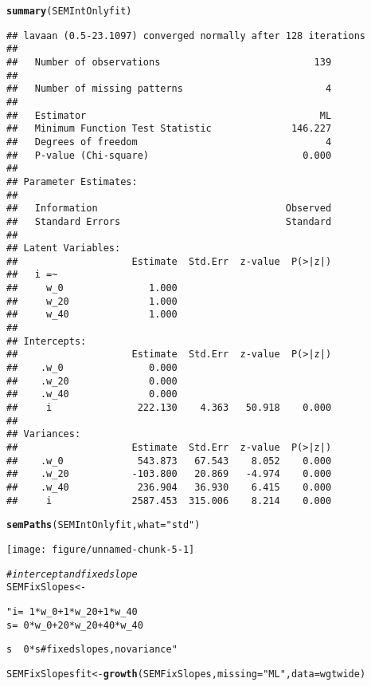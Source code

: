 \documentclass{article}\usepackage[]{graphicx}\usepackage[]{color}
\makeatletter
\def\maxwidth{ %
  \ifdim\Gin@nat@width>\linewidth
    \linewidth
  \else
    \Gin@nat@width
  \fi
}
\newcommand{\hlstr}[1]{\textcolor[rgb]{0.192,0.494,0.8}{#1}}%
\newcommand{\hlcom}[1]{\textcolor[rgb]{0.678,0.584,0.686}{\textit{#1}}}%
\newcommand{\hlstd}[1]{\textcolor[rgb]{0.345,0.345,0.345}{#1}}%
\newcommand{\hlkwb}[1]{\textcolor[rgb]{0.69,0.353,0.396}{#1}}%
\newcommand{\hlkwc}[1]{\textcolor[rgb]{0.333,0.667,0.333}{#1}}%
\newcommand{\hlkwd}[1]{\textcolor[rgb]{0.737,0.353,0.396}{\textbf{#1}}}%
\newenvironment{kframe}{%
 \def\at@end@of@kframe{}%
 \ifinner\ifhmode%
  \def\at@end@of@kframe{\end{minipage}}%
  \begin{minipage}{\columnwidth}%
 \fi\fi%
 \def\FrameCommand##1{\hskip\@totalleftmargin \hskip-\fboxsep
 \colorbox{shadecolor}{##1}\hskip-\fboxsep
     \hskip-\linewidth \hskip-\@totalleftmargin \hskip\columnwidth}%
 \MakeFramed {\advance\hsize-\width
   \@totalleftmargin\z@ \linewidth\hsize
   \@setminipage}}%
 {\par\unskip\endMakeFramed%
 \at@end@of@kframe}
\newenvironment{knitrout}{}{} %
\makeatother
\begin{document}
\begin{knitrout}
\begin{kframe}
{\ttfamily\noindent\color{warningcolor}{\#\# Warning in lav\_object\_post\_check(object): lavaan WARNING: some estimated ov variances are negative}}\begin{alltt}
\hlkwd{summary}\hlstd{(SEMIntOnlyfit)}
\end{alltt}
\begin{verbatim}
## lavaan (0.5-23.1097) converged normally after 128 iterations
## 
##   Number of observations                           139
## 
##   Number of missing patterns                         4
## 
##   Estimator                                         ML
##   Minimum Function Test Statistic              146.227
##   Degrees of freedom                                 4
##   P-value (Chi-square)                           0.000
## 
## Parameter Estimates:
## 
##   Information                                 Observed
##   Standard Errors                             Standard
## 
## Latent Variables:
##                    Estimate  Std.Err  z-value  P(>|z|)
##   i =~                                                
##     w_0               1.000                           
##     w_20              1.000                           
##     w_40              1.000                           
## 
## Intercepts:
##                    Estimate  Std.Err  z-value  P(>|z|)
##    .w_0               0.000                           
##    .w_20              0.000                           
##    .w_40              0.000                           
##     i               222.130    4.363   50.918    0.000
## 
## Variances:
##                    Estimate  Std.Err  z-value  P(>|z|)
##    .w_0             543.873   67.543    8.052    0.000
##    .w_20           -103.800   20.869   -4.974    0.000
##    .w_40            236.904   36.930    6.415    0.000
##     i              2587.453  315.006    8.214    0.000
\end{verbatim}
\begin{alltt}
\hlkwd{semPaths}\hlstd{(SEMIntOnlyfit,} \hlkwc{what} \hlstd{=} \hlstr{"std"}\hlstd{)}
\end{alltt}
\end{kframe}
\texttt{[image: figure/unnamed-chunk-5-1]} 
\begin{kframe}\begin{alltt}
\hlcom{# intercept and fixed slope}
\hlstd{SEMFixSlopes} \hlkwb{<-} \hlstr{" i =~ 1*w_0 + 1*w_20 + 1*w_40
                  s =~ 0*w_0 + 20*w_20 + 40*w_40

                  s ~~ 0*s #fixed slopes, no variance"}
\hlstd{SEMFixSlopesfit} \hlkwb{<-} \hlkwd{growth}\hlstd{(SEMFixSlopes,} \hlkwc{missing} \hlstd{=} \hlstr{"ML"}\hlstd{,} \hlkwc{data} \hlstd{= wgtwide)}
\end{alltt}



\end{kframe}
\end{knitrout}
\end{document}
